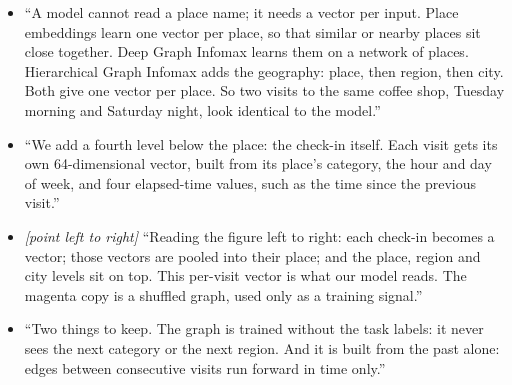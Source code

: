 \say
\begin{itemize}
  \item ``A model cannot read a place name; it needs a vector per input. Place embeddings learn one
        vector per place, so that similar or nearby places sit close together. Deep Graph Infomax learns
        them on a network of places. Hierarchical Graph Infomax adds the geography: place, then region,
        then city. Both give one vector per place. So two visits to the same coffee shop, Tuesday
        morning and Saturday night, look identical to the model.''
  \item ``We add a fourth level below the place: the check-in itself. Each visit gets its own
        64-dimensional vector, built from its place's category, the hour and day of week, and four
        elapsed-time values, such as the time since the previous visit.''
  \item \emph{[point left to right]} ``Reading the figure left to right: each check-in becomes a
        vector; those vectors are pooled into their place; and the place, region and city levels sit on
        top. This per-visit vector is what our model reads. The magenta copy is a shuffled graph, used
        only as a training signal.''
  \item ``Two things to keep. The graph is trained without the task labels: it never sees the next
        category or the next region. And it is built from the past alone: edges between consecutive
        visits run forward in time only.''
\end{itemize}

